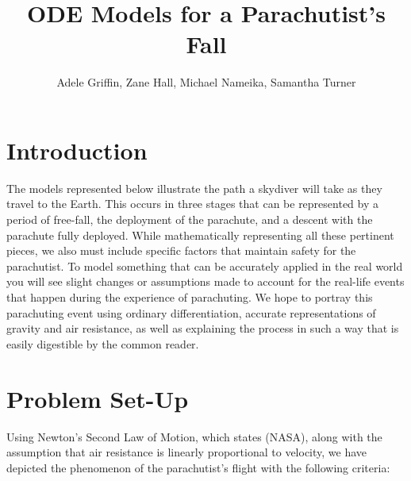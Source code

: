 \documentclass{article}
\title{ODE Models for a Parachutist's Fall}
\author{Adele Griffin, Zane Hall, Michael Nameika, Samantha Turner}
\date{}
\begin{document}
\maketitle

\section*{Introduction}


    The models represented below illustrate the path a skydiver will take as they travel to the Earth. This occurs in three stages that can be represented by a period of free-fall, the deployment of the parachute, and a descent with the parachute fully deployed. While mathematically representing all these pertinent pieces, we also must include specific factors that maintain safety for the parachutist. To model something that can be accurately applied in the real world you will see slight changes or assumptions made to account for the real-life events that happen during the experience of parachuting. We hope to portray this parachuting event using ordinary differentiation, accurate representations of gravity and air resistance, as well as explaining the process in such a way that is easily digestible by the common reader.

\section*{Problem Set-Up}


    Using Newton's Second Law of Motion, which states  (NASA), along with the assumption that air resistance is linearly proportional to velocity, we have depicted the phenomenon of the parachutist's flight with the following criteria:
\end{document}
